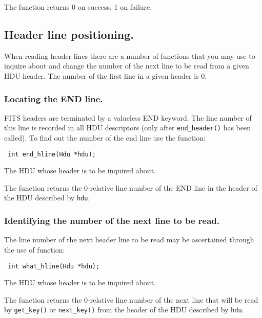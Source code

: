 The function returns 0 on success, 1 on failure.

\subsection{Header line positioning.}

When reading header lines there are a number of functions that you may
use to inquire about and change the number of the next line to be read
from a given HDU header. The number of the first line in a given
header is 0.

\subsubsection{Locating the END line.}

FITS headers are terminated by a valueless END keyword. The
line number of this line is recorded in all HDU descriptors (only
after \verb`end_header()` has been called). To find out the number of
the end line use the function:

\label{end_hline}\begin{verbatim}
 int end_hline(Hdu *hdu);
\end{verbatim}


\begin{arglist}
 The HDU whose header is to be inquired about.
\end{arglist}

The function returns the 0-relative line number of the END line in the
header of the HDU described by \verb`hdu`.

\subsubsection{Identifying the number of the next line to be read.}

The line number of the next header line to be read may be ascertained
through the use of function:

\label{what_hline}\begin{verbatim}
 int what_hline(Hdu *hdu);
\end{verbatim}


\begin{arglist}
 The HDU whose header is to be inquired about.
\end{arglist}

The function returns the 0-relative line number of the next line that
will be read by \verb`get_key()` or \verb`next_key()` from the header
of the HDU described by \verb`hdu`.

